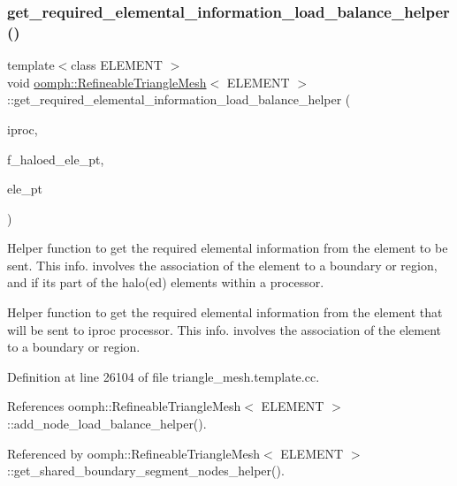\subsubsection{\texorpdfstring{get\+\_\+required\+\_\+elemental\+\_\+information\+\_\+load\+\_\+balance\+\_\+helper()}{get\_required\_elemental\_information\_load\_balance\_helper()}}
{\footnotesize\ttfamily template$<$class E\+L\+E\+M\+E\+NT $>$ \\
void \hyperlink{classoomph_1_1RefineableTriangleMesh}{oomph\+::\+Refineable\+Triangle\+Mesh}$<$ E\+L\+E\+M\+E\+NT $>$\+::get\+\_\+required\+\_\+elemental\+\_\+information\+\_\+load\+\_\+balance\+\_\+helper (\begin{DoxyParamCaption}\item[{unsigned \&}]{iproc,  }\item[{Vector$<$ Vector$<$ Finite\+Element $\ast$$>$ $>$ \&}]{f\+\_\+haloed\+\_\+ele\+\_\+pt,  }\item[{Finite\+Element $\ast$}]{ele\+\_\+pt }\end{DoxyParamCaption})\hspace{0.3cm}{\ttfamily [protected]}}



Helper function to get the required elemental information from the element to be sent. This info. involves the association of the element to a boundary or region, and if its part of the halo(ed) elements within a processor. 

Helper function to get the required elemental information from the element that will be sent to iproc processor. This info. involves the association of the element to a boundary or region. 

Definition at line 26104 of file triangle\+\_\+mesh.\+template.\+cc.



References oomph\+::\+Refineable\+Triangle\+Mesh$<$ E\+L\+E\+M\+E\+N\+T $>$\+::add\+\_\+node\+\_\+load\+\_\+balance\+\_\+helper().



Referenced by oomph\+::\+Refineable\+Triangle\+Mesh$<$ E\+L\+E\+M\+E\+N\+T $>$\+::get\+\_\+shared\+\_\+boundary\+\_\+segment\+\_\+nodes\+\_\+helper().

\mbox{\label{classoomph_1_1RefineableTriangleMesh_abfe2134892b2f845440947429d54539f}} 
